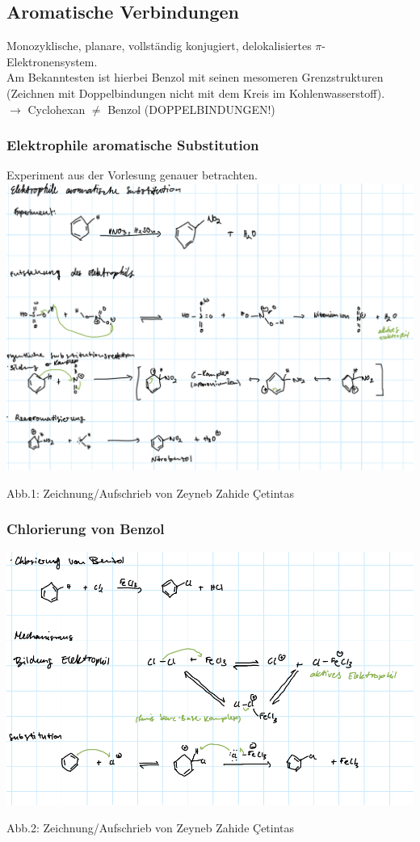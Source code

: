 \documentclass[a4paper, fleqn]{article}
\def\Cc{Ç}
\begin{document}
\subsection{Aromatische Verbindungen}
Monozyklische, planare, vollst\"andig konjugiert, delokalisiertes $\pi$-Elektronensystem.\\
Am Bekanntesten ist hierbei Benzol mit seinen mesomeren Grenzstrukturen (Zeichnen mit Doppelbindungen nicht mit dem Kreis im Kohlenwasserstoff).\\
$\rightarrow$ Cyclohexan $\neq$ Benzol (DOPPELBINDUNGEN!)
\subsubsection{Elektrophile aromatische Substitution}
Experiment aus der Vorlesung genauer betrachten.\\
\includegraphics[width=0.9\pdfpagewidth]{egrs.PNG}\\
\begin{center}
  Abb.1: Zeichnung/Aufschrieb von Zeyneb Zahide \Cc etintas
\end{center}
\subsubsection{Chlorierung von Benzol}
\includegraphics[width=0.9\pdfpagewidth]{knogh.PNG}
\begin{center}
  Abb.2: Zeichnung/Aufschrieb von Zeyneb Zahide \Cc etintas
\end{center}
\end{document}
